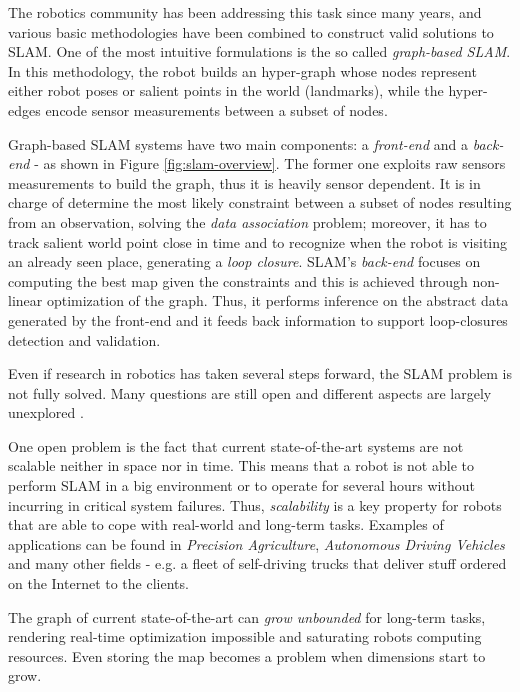 \documentclass[10pt,a4paper, notitlepage]{report}
\begin{document}
The robotics community has been addressing this task since many years, and various basic methodologies have been combined to construct valid solutions to SLAM. One of the most intuitive formulations is the so called \textit{graph-based SLAM}\cite{lu1997globally}. In this methodology, the robot builds an hyper-graph whose nodes represent either robot poses or salient points in the world (landmarks), while the hyper-edges encode sensor measurements between a subset of nodes. 

Graph-based SLAM systems have two main components: a \textit{front-end} and a \textit{back-end} - as shown in Figure \ref{fig:slam-overview}. The former one exploits raw sensors measurements to build the graph, thus it is heavily sensor dependent. It is in charge of determine the most likely constraint between a subset of nodes resulting from an observation, solving the \textit{data association} problem; moreover, it has to track salient world point close in time and to recognize when the robot is visiting an already seen place, generating a \textit{loop closure}. SLAM's \textit{back-end} focuses on computing the best map given the constraints and this is achieved through non-linear optimization of the graph. Thus, it performs inference on the abstract data generated by the front-end and it feeds back information to support loop-closures detection and validation.

Even if research in robotics has taken several steps forward, the SLAM problem is not fully solved. Many questions are still open and different aspects are largely unexplored \cite{carlone2016slam-survey}. 

One open problem is the fact that current state-of-the-art systems are not scalable neither in space nor in time. This means that a robot is not able to perform SLAM in a big environment or to operate for several hours without incurring in critical system failures. Thus, \textit{scalability} is a key property for robots that are able to cope with real-world and long-term tasks. Examples of applications can be found in \textit{Precision Agriculture}, \textit{Autonomous Driving Vehicles} and many other fields - e.g. a fleet of self-driving trucks that deliver stuff ordered on the Internet to the clients. 

The graph of current state-of-the-art can \textit{grow unbounded} for long-term tasks, rendering real-time optimization impossible and saturating robots computing resources. Even storing the map becomes a problem when dimensions start to grow.
\end{document}
